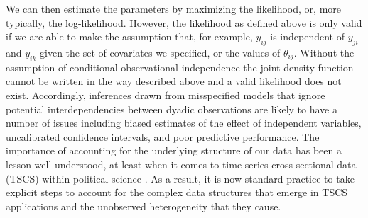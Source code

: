We can then estimate the parameters by maximizing the likelihood, or, more typically, the log-likelihood. However, the likelihood as defined above is only valid if we are able to make the assumption that, for example, $y_{ij}$ is independent of $y_{ji}$ and $y_{ik}$ given the set of covariates we specified, or the values of $\theta_{ij}$. Without the assumption of conditional observational independence the joint density function cannot be written in the way described above and a valid likelihood does not exist. Accordingly, inferences drawn from misspecified models that ignore potential interdependencies between dyadic observations are likely to have a number of issues including biased estimates of the effect of independent variables, uncalibrated confidence intervals, and poor predictive performance. The importance of accounting for the underlying structure of our data has been a lesson well understood, at least when it comes to time-series cross-sectional data (TSCS) within political science \citep{beck:katz:1995,beck:etal:1998}. As a result, it is now standard practice to take explicit steps to account for the complex data structures that emerge in TSCS applications and the unobserved heterogeneity that they cause.


